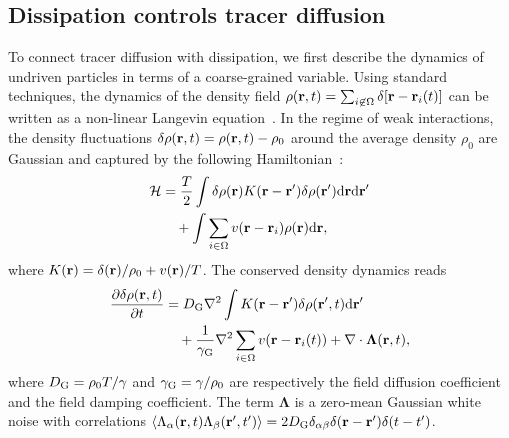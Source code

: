\documentclass[superscriptaddress, twocolumn, prx, longbibliography, nofootinbib]{revtex4-1}
\newcommand{\dd}{\text{d}}
\begin{document}


\subsection{Dissipation controls tracer diffusion}\label{sec:diff}

To connect tracer diffusion with dissipation, we first describe the dynamics of undriven particles in terms of a coarse-grained variable. Using standard techniques, the dynamics of the density field $\rho({\bf r},t) = \sum_{i\not\in\Omega}\delta[{\bf r}-{\bf r}_i(t)]$ can be written as a non-linear Langevin equation~\cite{Dean1996}. In the regime of weak interactions, the density fluctuations $\delta \rho({\bf r},t ) = \rho({\bf r}, t) - \rho_0$ around the average density $\rho_0$ are Gaussian and captured by the following Hamiltonian~\cite{Chandler1993, Demery2014, Kruger2017}:
\begin{equation}
	\begin{aligned}
		{\cal H} &= \frac{T}{2} \int \delta \rho ({\bf r}) K({\bf r} - {\bf r}') \delta \rho ({\bf r}') \dd{\bf r}\dd{\bf r}'
		\\
		&\quad + \int \sum_{i\in\Omega} v({\bf r}-{\bf r}_i) \rho({\bf r}) \dd{\bf r} ,
	\end{aligned}
\end{equation}
where $K({\bf r})= \delta({\bf r})/\rho_0 + v({\bf r})/T$. The conserved density dynamics reads
\begin{equation}\label{eq:EvolutionField}
	\begin{aligned}
		\frac{\partial \delta \rho({\bf r}, t)}{\partial t} &= D_{\rm G} \nabla^2 \int K({\bf r}-{\bf r}') \delta \rho({\bf r}', t) \dd{\bf r}'
		\\
		&\quad + \frac{1}{\gamma_{\rm G}} \nabla^2 \sum_{i\in\Omega}v({\bf r}-{\bf r}_i(t)) + \nabla \cdot {\boldsymbol\Lambda}({\bf r},t) ,
	\end{aligned}
\end{equation}
where $D_{\rm G} = \rho_0 T/\gamma$ and $\gamma_{\rm G}=\gamma/\rho_0$ are respectively the field diffusion coefficient and the field damping coefficient. The term $\boldsymbol\Lambda$ is a zero-mean Gaussian white noise with correlations $\langle \Lambda_\alpha({\bf r}, t) \Lambda_\beta({\bf r}', t') \rangle = 2 D_{\rm G} \delta_{\alpha\beta}\delta({\bf r} - {\bf r}')\delta(t-t')$.
\end{document}

